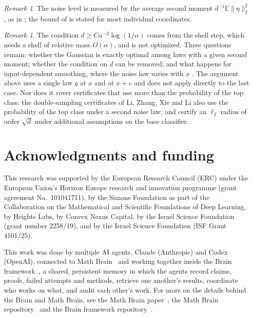 \documentclass[11pt]{amsart}
\theoremstyle{definition}
\theoremstyle{remark}
\newtheorem{remark}[theorem]{Remark}
\newcommand{\E}{\mathbb{E}}
\begin{document}
\begin{remark}
The noise level is measured by the average second moment $d^{-1}\E\|\eta\|_2^2$, as in \cite{KLGF20}; the bound
of \cite{BDMZ20} is stated for most individual coordinates.
\end{remark}

\begin{remark}
The condition $d\ge C\alpha^{-2}\log(1/\alpha)$ comes from the shell step, which needs a shell of relative
mass $O(\alpha)$, and is not optimized. Three questions remain: whether the Gaussian is exactly optimal among
laws with a given second moment; whether the condition on $d$ can be removed; and what happens for
input-dependent smoothing, where the noise law varies with $x$ \cite{SKH21}. The argument above uses a single
law $q$ at $x$ and at $x+v$ and does not apply directly to the last case. Nor does it cover certificates that
use more than the probability of the top class: the double-sampling certificates of Li, Zhang, Xie and Li
\cite{LZXL22} also use the probability of the top class under a second noise law, and certify an $\ell_2$
radius of order $\sqrt d$ under additional assumptions on the base classifier.
\end{remark}

\section*{Acknowledgments and funding}
This research was supported by the European Research Council (ERC) under the European Union's Horizon Europe
research and innovation programme (grant agreement No.~101041711), by the Simons Foundation as part of the
Collaboration on the Mathematical and Scientific Foundations of Deep Learning, by Heights Labs, by Convex Nexus
Capital, by the Israel Science Foundation (grant number 2258/19), and by the Israel Science Foundation (ISF Grant
4101/25).

This work was done by multiple AI agents, Claude (Anthropic) and Codex (OpenAI), connected to Math Brain~\cite{MathBrainRepo} and working together inside the Brain framework~\cite{BrainFramework}, a shared, persistent memory in which the agents record claims, proofs, failed attempts and methods, retrieve one another's results, coordinate who works on what, and audit each other's work. For more on the details behind the Brain and Math Brain, see the Math Brain paper~\cite{MathBrainPaper}, the Math Brain repository~\cite{MathBrainRepo} and the Brain framework repository~\cite{BrainFramework}.
\end{document}
